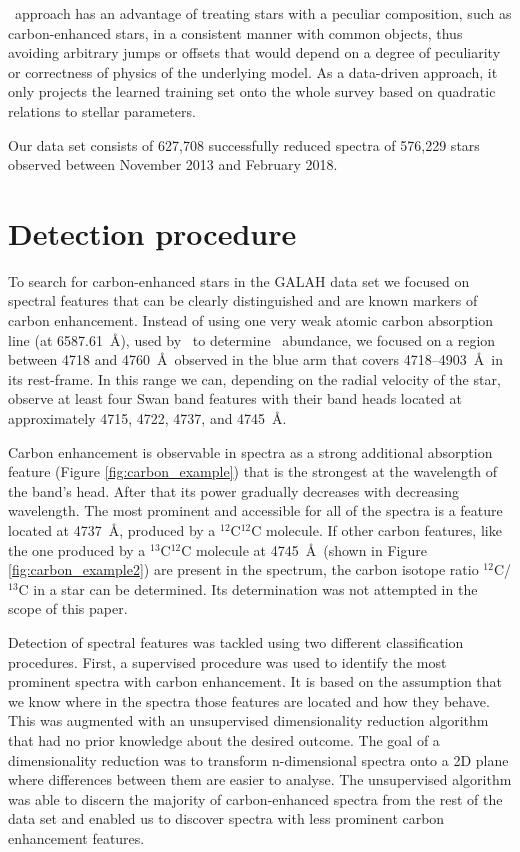 \TC\ approach has an advantage of treating stars with a peculiar composition, such as carbon-enhanced stars, in a consistent manner with common objects, thus avoiding arbitrary jumps or offsets that would depend on a degree of peculiarity or correctness of physics of the underlying model. As a data-driven approach, it only projects the learned training set onto the whole survey based on quadratic relations to stellar parameters.

Our data set consists of 627,708 successfully reduced spectra of 576,229 stars observed between November 2013 and February 2018.

\section{Detection procedure}
\label{sec:classification}
To search for carbon-enhanced stars in the GALAH data set we focused on spectral features that can be clearly distinguished and are known markers of carbon enhancement. Instead of using one very weak atomic carbon absorption line (at 6587.61~\AA), used by \TC\ to determine \Cfe\ abundance, we focused on a region between 4718 and 4760~\AA\ observed in the blue arm that covers 4718--4903~\AA\ in its rest-frame. In this range we can, depending on the radial velocity of the star, observe at least four Swan band features \citep{1927RSPTA.226..157J} with their band heads located at approximately 4715, 4722, 4737, and 4745~\AA. 

Carbon enhancement is observable in spectra as a strong additional absorption feature (Figure \ref{fig:carbon_example}) that is the strongest at the wavelength of the band's head. After that its power gradually decreases with decreasing wavelength. The most prominent and accessible for all of the spectra is a feature located at 4737~\AA, produced by a $^{12}$C$^{12}$C molecule. If other carbon features, like the one produced by a $^{13}$C$^{12}$C molecule at 4745~\AA\ (shown in Figure \ref{fig:carbon_example2}) are present in the spectrum, the carbon isotope ratio $^{12}$C/$^{13}$C in a star can be determined. Its determination was not attempted in the scope of this paper.

Detection of spectral features was tackled using two different classification procedures. First, a supervised procedure was used to identify the most prominent spectra with carbon enhancement. It is based on the assumption that we know where in the spectra those features are located and how they behave. This was augmented with an unsupervised dimensionality reduction algorithm that had no prior knowledge about the desired outcome. The goal of a dimensionality reduction was to transform n-dimensional spectra onto a 2D plane where differences between them are easier to analyse. The unsupervised algorithm was able to discern the majority of carbon-enhanced spectra from the rest of the data set and enabled us to discover spectra with less prominent carbon enhancement features.

